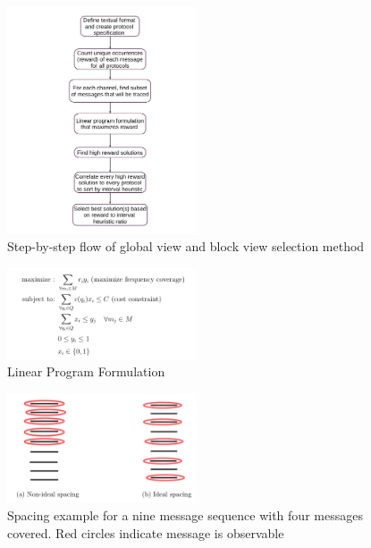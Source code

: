 \documentclass[conference]{IEEEtran}
\begin{document}
\begin{figure}[!ht]
\caption{Step-by-step flow of global view and block view selection method}
\label{procedure}
\centering
    \includegraphics[width=0.5\textwidth]{proc}
\end{figure}
\begin{figure}[!ht]

\caption{Linear Program Formulation}
\label{linear}
\centering
    \includegraphics[width=0.5\textwidth]{lin}
\end{figure}

\begin{figure}
\caption{Spacing example for a nine message sequence with four messages covered. Red circles indicate message is observable}
\label{interval}
\centering
    \includegraphics[width=0.5\textwidth]{inter}
\end{figure}
\end{document}
